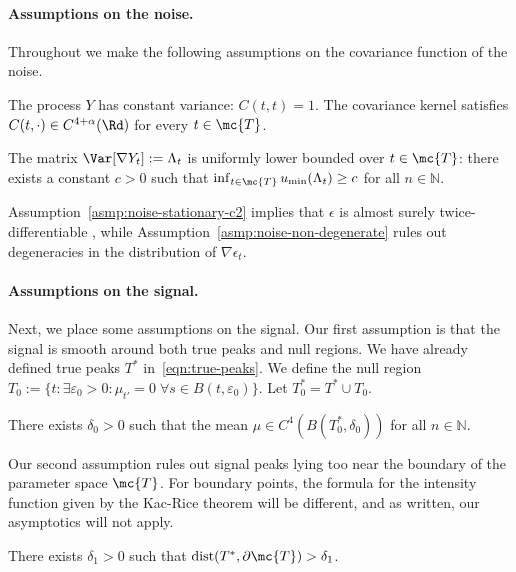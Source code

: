 \documentclass{article}
\newcommand{\ag}[1]{{\bf{{\red{[{AG: #1}]}}}}}
\begin{document}
	\paragraph{Assumptions on the noise.}
	Throughout we make the following assumptions on the covariance function of the noise. 
	\begin{assumption}
		\label{asmp:noise-stationary-c2}
		The process $Y$ has constant variance: $C(t,t) = 1$. The covariance kernel satisfies $C(t,\cdot) \in C^{4 + \alpha}(\Rd)$ for every $t \in \mc{T}$. 
	\end{assumption}
	\begin{assumption}
		\label{asmp:noise-non-degenerate}
		The matrix $\Var[\nabla Y_t] := \Lambda_t$ is uniformly lower bounded over $t \in \mc{T}$: there exists a constant $c > 0$ such that $\inf_{t \in \mc{T}} u_{\min}(\Lambda_t) \geq c$ for all $n \in \mathbb{N}$.
	\end{assumption}
	Assumption~\ref{asmp:noise-stationary-c2} implies that $\epsilon$ is almost surely twice-differentiable \ag{Need to check this}, while Assumption~\ref{asmp:noise-non-degenerate} rules out degeneracies in the distribution of $\nabla \epsilon_t$. 
	
	\paragraph{Assumptions on the signal.}
	Next, we place some assumptions on the signal. Our first assumption is that the signal is smooth around both true peaks and null regions. We have already defined true peaks $T^{\ast}$ in~\eqref{eqn:true-peaks}. We define the null region $T_0 := \{t: \exists \varepsilon_0 > 0: \mu_{t'} = 0 \; \forall s \in B(t,\varepsilon_0)\}$. Let $T_0^{\ast} = T^{\ast} \cup T_0$.
	\begin{assumption}
		\label{asmp:signal-holder}
		There exists $\delta_0 > 0$ such that the mean $\mu \in C^{4}(B(T_0^{\ast},\delta_0))$ for all $n \in \mathbb{N}$.
	\end{assumption}
	Our second assumption rules out signal peaks lying too near the boundary of the parameter space $\mc{T}$. For boundary points, the formula for the intensity function given by the Kac-Rice theorem  will be different, and as written, our asymptotics will not apply.
	
	\begin{assumption}
		\label{asmp:signal-boundary}
		There exists $\delta_1 > 0$ such that ${\rm dist}(T^{\ast},\partial \mc{T}) > \delta_1$.
	\end{assumption}
	
\end{document}
